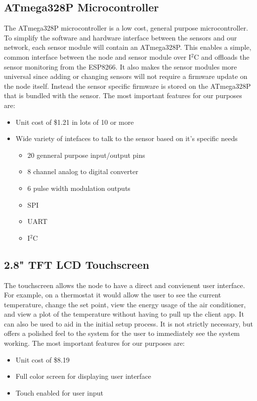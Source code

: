 		\subsection{ATmega328P Microcontroller}
			The ATmega328P microcontroller is a low cost, general purpose microcontroller. To simplify the software and hardware interface between the sensors and our network, each sensor module will contain an ATmega328P. This enables a simple, common interface between the node and sensor module over I$^2$C and offloads the sensor monitoring from the ESP8266. It also makes the sensor modules more universal since adding or changing sensors will not require a firmware update on the node itself. Instead the sensor specific firmware is stored on the ATmega328P that is bundled with the sensor. The most important features for our purposes are:
			\begin{itemize}
				\item Unit cost of \$1.21 in lots of 10 or more
				\item Wide variety of intefaces to talk to the sensor based on it's specific needs
				\begin{itemize}
					\item 20 genneral purpose input/output pins
					\item 8 channel analog to digital converter
					\item 6 pulse width modulation outputs
					\item SPI
					\item UART
					\item I$^2$C
				\end{itemize}
			\end{itemize}
		
		\subsection{2.8" TFT LCD Touchscreen}
		The touchscreen allows the node to have a direct and convienent user interface. For example, on a thermostat it would allow the user to see the current temperature, change the set point, view the energy usage of the air conditioner, and view a plot of the temperature without having to pull up the client app. It can also be used to aid in the initial setup process. It is not strictly necessary, but offers a polished feel to the system for the user to immediately see the system working. The most important features for our purposes are:
		\begin{itemize}
			\item Unit cost of \$8.19
			\item Full color screen for displaying user interface
			\item Touch enabled for user input
		\end{itemize}
		
